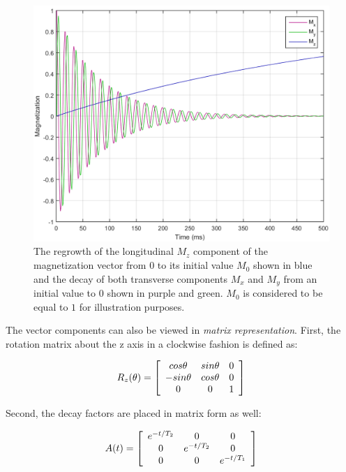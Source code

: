 \begin{figure}[ht]
    \centering
    \includegraphics[width=1\textwidth,keepaspectratio]{MxMyMz}
    \caption{The regrowth of the longitudinal $M_z$ component of the magnetization vector from $0$ to its initial value $M_0$ shown in blue and the decay of both transverse components $M_x$ and $M_y$ from an initial value to 0 shown in purple and green. $M_0$ is considered to be equal to $1$ for illustration purposes.}
    \label{fig:MxMyMz}
\end{figure}

The vector components can also be viewed in \textit{matrix representation}. First, the rotation matrix about the z axis in a clockwise fashion is defined as:

\begin{equation}
    R_z ( \theta ) = \left[
    \begin{array}{c c c}
          cos \theta & sin \theta & 0 \\
        - sin \theta & cos \theta & 0 \\
           0         &  0         & 1 
    \end{array}
    \right]
\end{equation}

Second, the decay factors are placed in matrix form as well:

\begin{equation}
    A ( t ) = \left[
    \begin{array}{c c c}
          e^{-t/T_2} &     0      &     0 \\
              0      & e^{-t/T_2} &     0 \\
              0      &     0      & e^{-t/T_1}
    \end{array}
    \right]
\end{equation}

